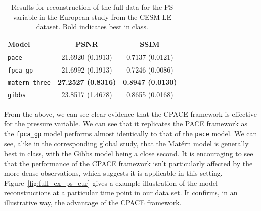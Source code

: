 \begin{table}
	\caption[Results for PS variable on full data in the European study]{Results for reconstruction of the full data for the PS variable in the European study from the CESM-LE dataset. Bold indicates best in class.}
	\centering
	\label{tab:full_cesm_ps_eur}
	\begin{tabular}{lcc}
		\toprule
		\textbf{Model} & \textbf{PSNR} & \textbf{SSIM} \\
		\midrule
		\verb*|pace| & 21.6920 (0.1913) & 0.7137 (0.0121) \\
		\verb*|fpca_gp| & 21.6992 (0.1913)& 0.7246	(0.0086) \\
		\verb*|matern_three| & \textbf{27.2527	(0.8316)}& \textbf{0.8947 (0.0130)}\\
		\verb*|gibbs| & 23.8517	(1.4678) & 0.8655 (0.0168)\\
		\bottomrule
	\end{tabular}
\end{table}

From the above, we can see clear evidence that the CPACE framework is effective for the pressure variable.
We can see that it replicates the PACE framework as the \verb*|fpca_gp| model performs almost identically to that of the \verb*|pace| model.
We can see, alike in the corresponding global study, that the Mat\'ern model is generally best in class, with the Gibbs model being a close second.
It is encouraging to see that the performance of the CPACE framework isn't particularly affected by the more dense observations, which suggests it is applicable in this setting. 
Figure~\ref{fig:full_ex_ps_eur} gives a example illustration of the model reconstructions at a particular time point in our data set.
It confirms,  in an illustrative way, the advantage of the CPACE framework.

